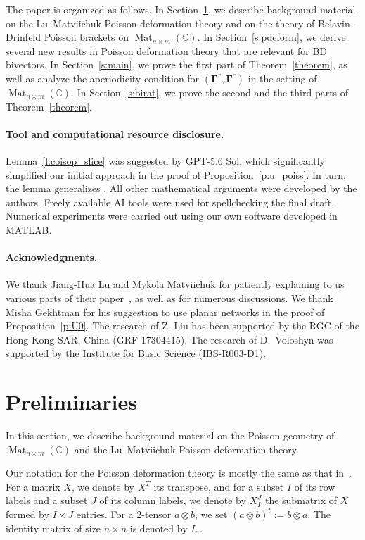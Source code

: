 \documentclass[11pt]{article}
\newcommand{\bg}{\mathbf{\Gamma}}
\DeclareMathOperator{\Mat}{Mat}
\theoremstyle{definition}\newtheorem{definition}[theorem]{Definition}
\theoremstyle{definition}\newtheorem{remark}[theorem]{Remark}
\theoremstyle{remark}
\numberwithin{equation}{section}
\begin{document}
The paper is organized as follows. In Section~\ref{s:prelims}, we describe  background material on the Lu--Matviichuk Poisson deformation theory and on the theory of Belavin--Drinfeld Poisson brackets on $\Mat_{n\times m}(\mathbb{C})$. In Section~\ref{s:pdeform}, we derive several new results in Poisson deformation theory that are relevant for BD bivectors. In Section~\ref{s:main}, we prove the first part of Theorem~\ref{theorem}, as well as analyze the aperiodicity condition for $(\bg^r,\bg^c)$ in the setting of $\Mat_{n\times m}(\mathbb{C})$. In Section~\ref{s:birat}, we prove the second and the third parts of Theorem~\ref{theorem}.

\paragraph{Tool and computational resource disclosure.} 
Lemma~\ref{l:coisop_slice} was suggested by GPT-5.6 Sol, which significantly simplified our initial approach in the proof of Proposition~\ref{p:u_poiss}. In turn, the lemma generalizes \cite[Proposition 6.7, Part 1]{lu-evens}. All other mathematical arguments were developed by the authors. Freely available AI tools were used for spellchecking the final draft. Numerical experiments were carried out using our own software developed in MATLAB.

\paragraph{Acknowledgments.} We thank Jiang-Hua Lu and Mykola Matviichuk for patiently explaining to us various parts of their paper~\cite{lm-deform}, as well as for numerous discussions. We thank Misha Gekhtman for his suggestion to use planar networks in the proof of Proposition~\ref{p:U0}. The research of Z. Liu has been supported by the RGC of the Hong Kong SAR, China (GRF 17304415). The research of D.~Voloshyn was supported by the Institute for Basic Science (IBS-R003-D1).

\section{Preliminaries}\label{s:prelims}
In this section, we describe background material on the Poisson geometry of $\Mat_{n\times m}(\mathbb{C})$ and the Lu--Matviichuk Poisson deformation theory. 

Our notation for the Poisson deformation theory is mostly the same as that in~\cite{lm-deform}. For a matrix $X$, we denote by $X^T$ its transpose, and for a subset $I$ of its row labels and a subset $J$ of its column labels, we denote by $X_{I}^J$ the submatrix of $X$ formed by $I\times J$ entries. For a $2$-tensor $a\otimes b$, we set $(a\otimes b)^t := b\otimes a$. The identity matrix of size $n\times n$ is denoted by $I_n$.
\end{document}
